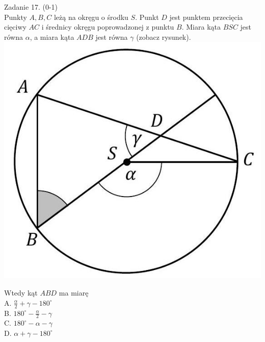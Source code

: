 \documentclass[10pt]{article}
\begin{document}
Zadanie 17. (0-1)\\
Punkty \(A, B, C\) leżą na okręgu o środku \(S\). Punkt \(D\) jest punktem przecięcia cięciwy \(A C\) i średnicy okręgu poprowadzonej z punktu \(B\). Miara kąta \(B S C\) jest równa \(\alpha\), a miara kąta \(A D B\) jest równa \(\gamma\) (zobacz rysunek).\\
\includegraphics[max width=\textwidth, center]{2024_11_21_465acd0c12fa3e05e8a7g-10(1)}

Wtedy kąt \(A B D\) ma miarę\\
A. \(\frac{\alpha}{2}+\gamma-180^{\circ}\)\\
B. \(180^{\circ}-\frac{\alpha}{2}-\gamma\)\\
C. \(180^{\circ}-\alpha-\gamma\)\\
D. \(\alpha+\gamma-180^{\circ}\)
\end{document}
